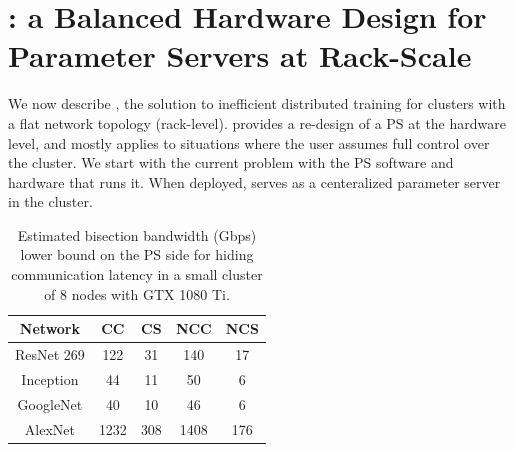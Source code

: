 \chapter{\pbox: a Balanced Hardware Design for Parameter Servers at Rack-Scale}
\label{sec:phub}
We now describe \pbox, the solution to inefficient distributed training for clusters with a flat network topology (rack-level). \pbox provides a re-design of a PS at the hardware level, and mostly applies to situations where the user assumes full control over the cluster. We start with the current problem with the PS software and hardware that runs it. When deployed, \pbox serves as a centeralized parameter server in the cluster.

\begin{table}
        \centering
        \footnotesize
	\begin{tabular}{|c|c|c|c|c|}
		\hline
		Network   & CC & CS & NCC & NCS\\
		\hline
		ResNet 269    & 122   & 31   & 140    &  17   \\
		\hline
		Inception & 44   &  11  &  50   &  6  \\
		\hline
		GoogleNet & 40   &  10  &  46   &  6  \\
	
		\hline 
		AlexNet   & 1232  &  308  & 1408    &  176  \\
		\hline
	\end{tabular}
	\caption{Estimated bisection bandwidth (Gbps) lower bound on the PS side for hiding communication latency in a small cluster of 8 nodes with GTX 1080 Ti.}
	\label{table:bwReqDC}
\end{table}

